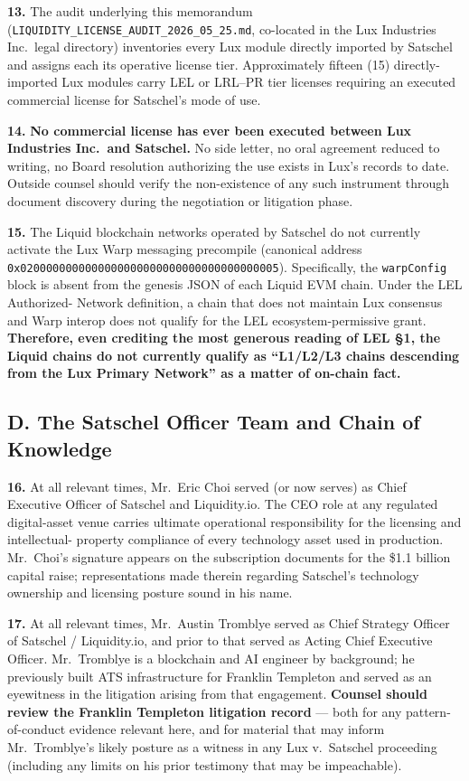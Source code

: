\documentclass[11pt,letterpaper]{article}
\begin{document}
\textbf{13.} The audit underlying this memorandum
(\texttt{LIQUIDITY\_LICENSE\_AUDIT\_2026\_05\_25.md}, co-located in
the Lux Industries Inc.\ legal directory) inventories every Lux module
directly imported by Satschel and assigns each its operative license
tier. Approximately fifteen (15) directly-imported Lux modules carry
LEL or LRL--PR tier licenses requiring an executed commercial license
for Satschel's mode of use.

\textbf{14.} \textbf{No commercial license has ever been executed
between Lux Industries Inc.\ and Satschel.} No side letter, no oral
agreement reduced to writing, no Board resolution authorizing the use
exists in Lux's records to date. Outside counsel should verify the
non-existence of any such instrument through document discovery during
the negotiation or litigation phase.

\textbf{15.} The Liquid blockchain networks operated by Satschel do
not currently activate the Lux Warp messaging precompile (canonical
address \texttt{0x0200000000000000000000000000000000000005}).
Specifically, the \texttt{warpConfig} block is absent from the
genesis JSON of each Liquid EVM chain. Under the LEL Authorized-
Network definition, a chain that does not maintain Lux consensus and
Warp interop does not qualify for the LEL ecosystem-permissive grant.
\textbf{Therefore, even crediting the most generous reading of LEL
\S 1, the Liquid chains do not currently qualify as ``L1/L2/L3 chains
descending from the Lux Primary Network'' as a matter of on-chain
fact.}

\subsection*{D. The Satschel Officer Team and Chain of Knowledge}

\textbf{16.} At all relevant times, Mr.\ Eric Choi served (or now
serves) as Chief Executive Officer of Satschel and Liquidity.io. The
CEO role at any regulated digital-asset venue carries ultimate
operational responsibility for the licensing and intellectual-
property compliance of every technology asset used in production.
Mr.\ Choi's signature appears on the subscription documents for the
\$1.1 billion capital raise; representations made therein regarding
Satschel's technology ownership and licensing posture sound
in his name.

\textbf{17.} At all relevant times, Mr.\ Austin Tromblye served as
Chief Strategy Officer of Satschel / Liquidity.io, and prior to that
served as Acting Chief Executive Officer. Mr.\ Tromblye is a
blockchain and AI engineer by background; he previously built ATS
infrastructure for Franklin Templeton and served as an eyewitness in
the litigation arising from that engagement. \textbf{Counsel should
review the Franklin Templeton litigation record} --- both for any
pattern-of-conduct evidence relevant here, and for material that may
inform Mr.\ Tromblye's likely posture as a witness in any Lux v.\
Satschel proceeding (including any limits on his prior testimony
that may be impeachable).
\end{document}
